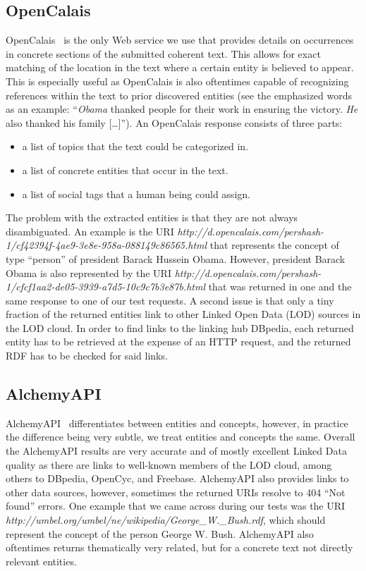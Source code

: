 \documentclass[twocolumn]{article}
\begin{document}
\subsection{OpenCalais}\label{sec:opencalais}
OpenCalais~\cite{OpenCalais} is the only Web service we use that provides details on occurrences in concrete sections of the submitted coherent text. This allows for exact matching of the location in the text where a certain entity is believed to appear. This is especially useful as OpenCalais is also oftentimes capable of recognizing references within the text to prior discovered entities (see the emphasized words as an example: ``\emph{Obama} thanked people for their work in ensuring the victory. \emph{He} also thanked his family […]''). An OpenCalais response consists of three parts:

\begin{itemize}
\item a list of topics that the text could be categorized in.
\item a list of concrete entities that occur in the text.
\item a list of social tags that a human being could assign.
\end{itemize}

The problem with the extracted entities is that they are not always disambiguated. An example is the URI \textit{http://d.opencalais.com/pershash-1/cf42394f-4ae9-3e8e-958a-088149c86565.html} that represents the concept of type ``person'' of president Barack Hussein Obama. However, president Barack Obama is also represented by the URI \textit{http://d.opencalais.com/pershash-1/cfcf1aa2-de05-3939-a7d5-10c9c7b3e87b.html} that was returned in one and the same response to one of our test requests. A second issue is that only a tiny fraction of the returned entities link to other Linked Open Data (LOD) sources in the LOD cloud. In order to find links to the linking hub DBpedia, each returned entity has to be retrieved at the expense of an HTTP request, and the returned RDF has to be checked for said links.

\subsection{AlchemyAPI}
AlchemyAPI~\cite{AlchemyAPI} differentiates between entities and concepts, however, in practice the difference being very subtle, we treat entities and concepts the same. Overall the AlchemyAPI results are very accurate and of mostly excellent Linked Data quality as there are links to well-known members of the LOD cloud, among others to DBpedia, OpenCyc, and Freebase. AlchemyAPI also provides links to other data sources, however, sometimes the returned URIs resolve to 404 ``Not found'' errors. One example that we came across during our tests was the URI \textit{http://umbel.org/umbel/ne/wikipedia/George\_W.\_Bush.rdf}, which should represent the concept of the person George W. Bush. AlchemyAPI also oftentimes returns thematically very related, but for a concrete text not directly relevant entities.
\end{document}
